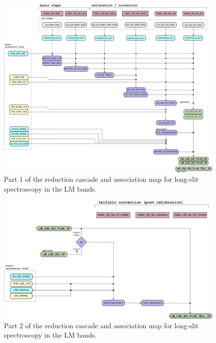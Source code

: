 \begin{figure}
  \centering
  \includegraphics[width=0.9\textheight]{figures/LM_LSS_pipeline_wf_draft_latest_part_1_v0.82.png}
  \caption[Reduction cascade and association map for LM long-slit
  spectroscopy]{Part 1 of the reduction cascade and association map for long-slit
    spectroscopy in the LM bands.}
  \label{Fig:LMLssAssomap1}
\end{figure}

\begin{figure}
  \centering
  \includegraphics[width=0.8\textheight]{figures/LM_LSS_pipeline_wf_draft_latest_part_2_v0.82.png}
  \caption[Reduction cascade and association map for LM long-slit
  spectroscopy]{Part 2 of the reduction cascade and association map for long-slit
    spectroscopy in the LM bands.}
  \label{Fig:LMLssAssomap2}
\end{figure}


